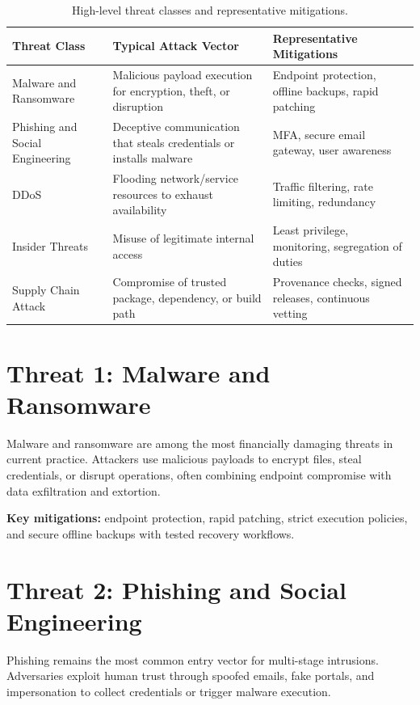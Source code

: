 \begin{table}[htbp]
\centering
\caption{High-level threat classes and representative mitigations.}
\label{tab:threat-overview}
\begin{tabular}{p{} p{} p{}}
\toprule
\textbf{Threat Class} & \textbf{Typical Attack Vector} & \textbf{Representative Mitigations} \\
\midrule
Malware and Ransomware & Malicious payload execution for encryption, theft, or disruption & Endpoint protection, offline backups, rapid patching \\
Phishing and Social Engineering & Deceptive communication that steals credentials or installs malware & MFA, secure email gateway, user awareness \\
DDoS & Flooding network/service resources to exhaust availability & Traffic filtering, rate limiting, redundancy \\
Insider Threats & Misuse of legitimate internal access & Least privilege, monitoring, segregation of duties \\
Supply Chain Attack & Compromise of trusted package, dependency, or build path & Provenance checks, signed releases, continuous vetting \\
\bottomrule
\end{tabular}
\end{table}

\section{Threat 1: Malware and Ransomware}

Malware and ransomware are among the most financially damaging threats in current practice.
Attackers use malicious payloads to encrypt files, steal credentials, or disrupt operations,
often combining endpoint compromise with data exfiltration and extortion.

\textbf{Key mitigations:} endpoint protection, rapid patching, strict execution policies,
and secure offline backups with tested recovery workflows.

\section{Threat 2: Phishing and Social Engineering}

Phishing remains the most common entry vector for multi-stage intrusions.
Adversaries exploit human trust through spoofed emails, fake portals, and impersonation to
collect credentials or trigger malware execution.

